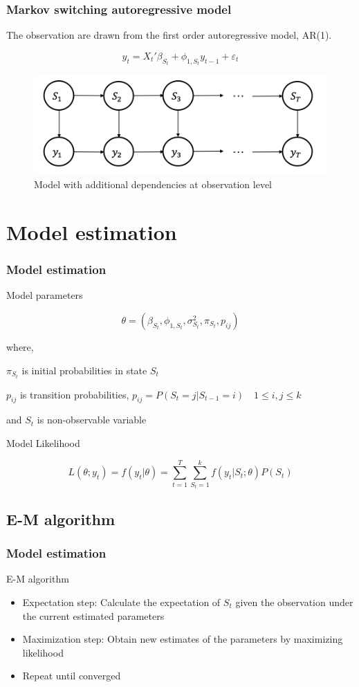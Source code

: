 \documentclass{beamer}
\begin{document}
\begin{frame}
\frametitle{Markov switching autoregressive model}
The observation are drawn from the first order autoregressive model, AR(1).

$$y_{t} = {X_{t}}' \beta_{S_{t}} + \phi_{1,S_{t}} y_{t-1} + \varepsilon_{t}$$

\begin{figure}
	\includegraphics[width=0.5\linewidth]{msm-ar}
	\caption{Model with additional dependencies at observation level}
\end{figure}
\end{frame}

\section{Model estimation}
\begin{frame}
\frametitle{Model estimation}
Model parameters

$$\theta = (\beta_{S_{t}}, \phi_{1,S_{t}},\sigma^{2}_{S_{t}}, \pi_{S_{t}}, p_{ij})$$

where,

$\pi_{S_{t}}$ is initial probabilities in state $S_{t}$

$p_{ij}$ is transition probabilities, $p_{ij}=P(S_{t}=j|S_{t-1}=i) \quad 1\leqslant i,j\leqslant k $

and $S_{t}$ is non-observable variable

\vspace{5mm}

Model Likelihood

$$L(\theta;y_{t}) = f(y_{t}|\theta) = \sum_{t=1}^{T}\sum_{S_{t}=1}^{k} f(y_{t}|S_{t};\theta)P(S_{t})$$

\end{frame}

\subsection{E-M algorithm}
\begin{frame}
\frametitle{Model estimation}	
E-M algorithm 
\begin{itemize}
	\item Expectation step: Calculate the expectation of $S_{t}$ given the observation under the current estimated parameters
	\item Maximization step: Obtain new estimates of the parameters by maximizing likelihood 
	\item Repeat until converged
\end{itemize}

\end{frame}
\end{document}
